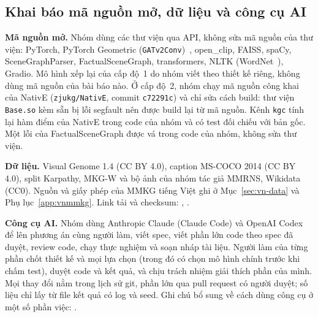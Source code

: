 \subsection*{Khai báo mã nguồn mở, dữ liệu và công cụ AI}

\textbf{Mã nguồn mở.} Nhóm dùng các thư viện qua API, không sửa mã nguồn của thư viện: PyTorch, PyTorch Geometric
(\texttt{GATv2Conv})~\cite{fey2019pyg}, open\_clip, FAISS, spaCy, SceneGraphParser, FactualSceneGraph, transformers, NLTK
(WordNet~\cite{miller1995wordnet}), Gradio. Mô hình xếp lại của cấp độ~1 do nhóm viết theo thiết kế riêng, không dùng mã
nguồn của bài báo nào. Ở cấp độ~2, nhóm chạy mã nguồn công khai của NativE (\texttt{zjukg/NativE}, commit \texttt{c72291c})
và chỉ sửa cách build: thư viện \texttt{Base.so} kèm sẵn bị lỗi segfault nên được build lại từ mã nguồn. Kênh \texttt{kgc}
tính lại hàm điểm của NativE trong code của nhóm và có test đối chiếu với bản gốc. Một lỗi của FactualSceneGraph được vá
trong code của nhóm, không sửa thư viện.

\textbf{Dữ liệu.} Visual Genome 1.4 (CC BY 4.0), caption MS-COCO 2014 (CC BY 4.0), split Karpathy, MKG-W và bộ ảnh của nhóm
tác giả MMRNS, Wikidata (CC0). Nguồn và giấy phép của MMKG tiếng Việt ghi ở Mục~\ref{sec:vn-data} và Phụ lục~\ref{app:vnmmkg}. Link tải và checksum:
, .

\textbf{Công cụ AI.} Nhóm dùng Anthropic Claude (Claude Code) và OpenAI Codex để lên phương án cùng người làm, viết spec,
viết phần lớn code theo spec đã duyệt, review code, chạy thực nghiệm và soạn nháp tài liệu. Người làm của từng phần chốt
thiết kế và mọi lựa chọn (trong đó có chọn mô hình chính trước khi chấm test), duyệt code và kết quả, và chịu trách nhiệm
giải thích phần của mình. Mọi thay đổi nằm trong lịch sử git, phần lớn qua pull request có người duyệt; số liệu chỉ lấy từ
file kết quả có log và seed. Ghi chú bổ sung về cách dùng công cụ ở một số phần việc: .
